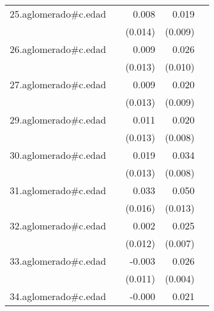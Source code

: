 {\begin{longtable}{l*{4}{D{.}{.}{-1}}}
\addlinespace
25.aglomerado#c.edad&                     &       0.008         &       0.019\sym{*}  &                     \\
            &                     &     (0.014)         &     (0.009)         &                     \\
\addlinespace
26.aglomerado#c.edad&                     &       0.009         &       0.026\sym{**} &                     \\
            &                     &     (0.013)         &     (0.010)         &                     \\
\addlinespace
27.aglomerado#c.edad&                     &       0.009         &       0.020\sym{*}  &                     \\
            &                     &     (0.013)         &     (0.009)         &                     \\
\addlinespace
29.aglomerado#c.edad&                     &       0.011         &       0.020\sym{*}  &                     \\
            &                     &     (0.013)         &     (0.008)         &                     \\
\addlinespace
30.aglomerado#c.edad&                     &       0.019         &       0.034\sym{***}&                     \\
            &                     &     (0.013)         &     (0.008)         &                     \\
\addlinespace
31.aglomerado#c.edad&                     &       0.033\sym{*}  &       0.050\sym{***}&                     \\
            &                     &     (0.016)         &     (0.013)         &                     \\
\addlinespace
32.aglomerado#c.edad&                     &       0.002         &       0.025\sym{***}&                     \\
            &                     &     (0.012)         &     (0.007)         &                     \\
\addlinespace
33.aglomerado#c.edad&                     &      -0.003         &       0.026\sym{***}&                     \\
            &                     &     (0.011)         &     (0.004)         &                     \\
\addlinespace
34.aglomerado#c.edad&                     &      -0.000         &       0.021\sym{*}  &                     \\

\end{longtable}}
